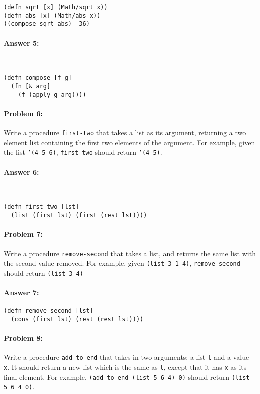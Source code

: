 \documentclass[12pt, letterpaper]{article}
\begin{document}
\begin{lstlisting}
(defn sqrt [x] (Math/sqrt x))
(defn abs [x] (Math/abs x))
((compose sqrt abs) -36)
\end{lstlisting}
\paragraph{Answer 5:}~\begin{lstlisting}
(defn compose [f g]
  (fn [& arg]
    (f (apply g arg))))
\end{lstlisting}

\hrulefill
\paragraph{Problem 6:}
  Write a procedure \texttt{first-two} that takes a list as its argument,
  returning a two element list containing the first two elements of
  the argument. For example, given the list \texttt{'(4 5 6)},
  \texttt{first-two} should return \texttt{'(4 5)}.

\paragraph{Answer 6:}~\begin{lstlisting}
(defn first-two [lst]
  (list (first lst) (first (rest lst))))
\end{lstlisting}

\hrulefill
\paragraph{Problem 7:}
Write a procedure \texttt{remove-second} that takes a list, and
returns the same list with the second value removed. For example,
given \texttt{(list 3 1 4)}, \texttt{remove-second} should return
\texttt{(list 3 4)}

\paragraph{Answer 7:} \begin{lstlisting}
(defn remove-second [lst]
  (cons (first lst) (rest (rest lst))))
\end{lstlisting}

\hrulefill
\paragraph{Problem 8:}
  Write a procedure \texttt{add-to-end} that takes in two arguments: a
  list \texttt{l} and a value \texttt{x}. It should return a new list
  which is the same as \texttt{l}, except that it has \texttt{x} as
  its final element. For example, \texttt{(add-to-end (list 5 6 4) 0)}
  should return \texttt{(list 5 6 4 0)}.
\end{document}
